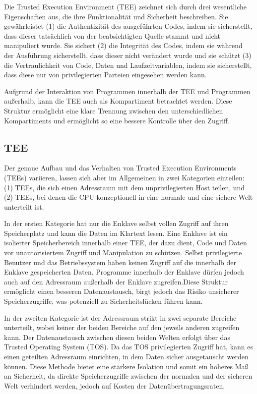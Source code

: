 Die Trusted Execution Environment (TEE) zeichnet sich durch drei wesentliche Eigenschaften aus, die ihre Funktionalität und Sicherheit beschreiben. Sie gewährleistet (1) die Authentizität des ausgeführten Codes, indem sie sicherstellt, dass dieser tatsächlich von der beabsichtigten Quelle stammt und nicht manipuliert wurde.  Sie sichert (2) die Integrität des Codes, indem sie während der Ausführung sicherstellt, dass dieser nicht verändert wurde und sie schützt (3) die Vertraulichkeit von Code, Daten und Laufzeitvariablen, indem sie sicherstellt, dass diese nur von privilegierten Parteien eingesehen werden kann. 

Aufgrund der Interaktion von Programmen innerhalb der TEE und Programmen außerhalb, kann die TEE auch als Kompartiment betrachtet werden. Diese Struktur ermöglicht eine klare Trennung zwischen den unterschiedlichen Kompartiments und ermöglicht so eine bessere Kontrolle über den Zugriff.

\subsection{TEE}
Der genaue Aufbau und das Verhalten von Trusted Execution Environments (TEEs) variieren, lassen sich aber im Allgemeinen in zwei Kategorien einteilen: (1) TEEs, die sich einen Adressraum mit dem unprivilegierten Host teilen, und (2) TEEs, bei denen die CPU konzeptionell in eine normale und eine sichere Welt unterteilt ist.

In der ersten Kategorie hat nur die Enklave selbst vollen Zugriff auf ihren Speicherplatz und kann die Daten im Klartext lesen. Eine Enklave ist ein isolierter Speicherbereich innerhalb einer TEE, der dazu dient, Code und Daten vor unautorisiertem Zugriff und Manipulation zu schützen. Selbst privilegierte Benutzer und das Betriebssystem haben keinen Zugriff auf die innerhalb der Enklave gespeicherten Daten. Programme innerhalb der Enklave dürfen jedoch auch auf den Adressraum außerhalb der Enklave zugreifen.Diese Struktur ermöglicht einen besseren Datenaustausch, birgt jedoch das Risiko unsicherer Speicherzugriffe, was potenziell zu Sicherheitslücken führen kann.

In der zweiten Kategorie ist der Adressraum strikt in zwei separate Bereiche unterteilt, wobei keiner der beiden Bereiche auf den jeweils anderen zugreifen kann. Der Datenaustausch zwischen diesen beiden Welten erfolgt über das Trusted Operating System (TOS). Da das TOS privilegierten Zugriff hat, kann es einen geteilten Adressraum einrichten, in dem Daten sicher ausgetauscht werden können. Diese Methode bietet eine stärkere Isolation und somit ein höheres Maß an Sicherheit, da direkte Speicherzugriffe zwischen der normalen und der sicheren Welt verhindert werden, jedoch auf Kosten der Datenübertragungsraten.


